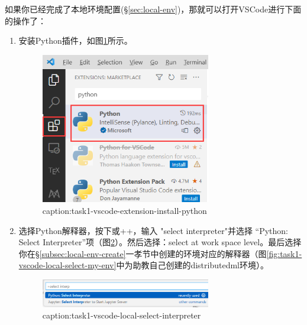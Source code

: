 如果你已经完成了本地环境配置(\S\ref{sec:local-env})，那就可以打开VSCode进行下面的操作了：

\begin{enumerate}
    \item 安装Python插件，如图\ref{fig:task1-vscode-extension-install-python}所示。
        \begin{figure}[htbp]
            \centering
            \includegraphics[width=0.7\textwidth]{figures/task1-vscode-extension-install-python.png}
            \caption{caption:task1-vscode-extension-install-python}
            \label{fig:task1-vscode-extension-install-python}
        \end{figure}
    \item 选择Python解释器，按下或++，输入 "select interpreter"并选择 “Python: Select Interpreter”项（图\ref{fig:task1-vscode-local-select-interpreter}）。然后选择：select at work space level。最后选择你在\S\ref{subsec:local-env-create}一孝节中创建的环境对应的解释器（图\ref{fig:task1-vscode-local-select-my-env}中为助教自己创建的distributedml环境）。
        \begin{figure}[htbp]
            \centering
            \includegraphics[width=0.7\textwidth]{figures/task1-vscode-local-select-interpreter.png}
            \caption{caption:task1-vscode-local-select-interpreter}
            \label{fig:task1-vscode-local-select-interpreter}
        \end{figure}
        \begin{figure}[htbp]

\end{figure}
\end{enumerate}
